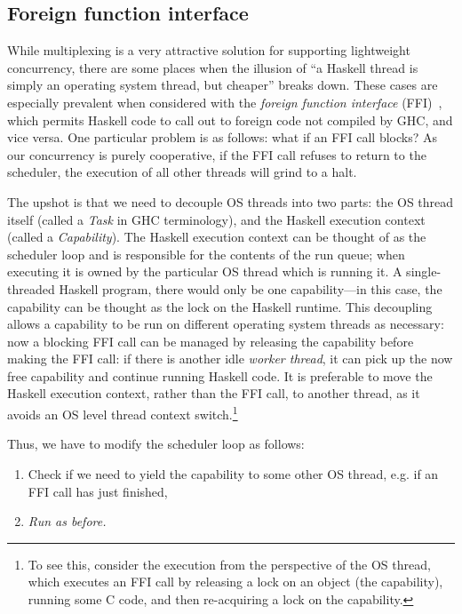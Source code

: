 \subsection{Foreign function interface}

While multiplexing is a very attractive solution for supporting
lightweight concurrency, there are some places when the illusion of ``a
Haskell thread is simply an operating system thread, but cheaper''
breaks down.  These cases are especially prevalent when considered with
the \emph{foreign function interface} (FFI)~\cite{Marlow04extendingthe},
which permits Haskell code to call out to foreign code not compiled by
GHC, and vice versa.  One particular problem is as follows: what if an
FFI call blocks?  As our concurrency is purely cooperative, if the FFI
call refuses to return to the scheduler, the execution of all other
threads will grind to a halt.

The upshot is that we need to decouple OS threads into two parts: the OS
thread itself (called a \emph{Task} in GHC terminology), and the Haskell
execution context (called a \emph{Capability}).  The Haskell execution
context can be thought of as the scheduler loop and is responsible for
the contents of the run queue; when executing it is owned by the
particular OS thread which is running it.  A single-threaded Haskell
program, there would only be one capability---in this case, the
capability can be thought as the lock on the Haskell runtime.  This
decoupling allows a capability to be run on different operating system
threads as necessary: now a blocking FFI call can be managed by
releasing the capability before making the FFI call: if there is another
idle \emph{worker thread}, it can pick up the now free capability and
continue running Haskell code.  It is preferable to move the Haskell
execution context, rather than the FFI call, to another thread, as it
avoids an OS level thread context switch.\footnote{To see this, consider
the execution from the perspective of the OS thread, which executes
an FFI call by releasing a lock on an object (the capability),
running some C code, and then re-acquiring a lock on the
capability.}

Thus, we have to modify the scheduler loop as follows:

\begin{enumerate}
    \item Check if we need to yield the capability to some other OS thread, e.g. if an FFI call has just finished,
    \item \emph{Run as before.}
\end{enumerate}

